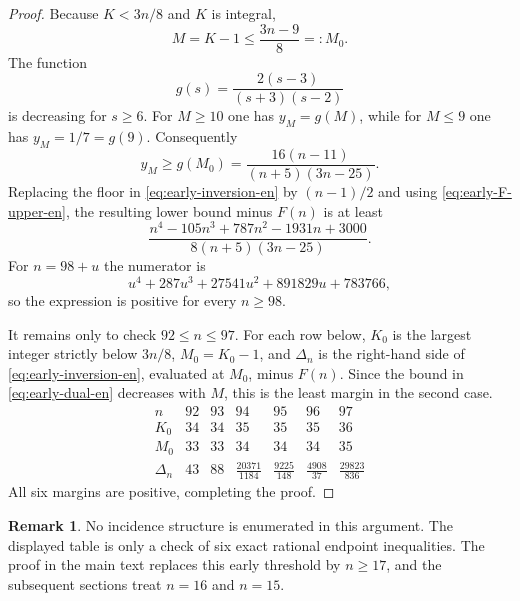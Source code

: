 \documentclass[11pt,a4paper]{article}
\theoremstyle{definition}
\newtheorem{remark}[theorem]{Remark}
\begin{document}
\begin{proof}
Because $K<3n/8$ and $K$ is integral,
\[
 M=K-1\le\frac{3n-9}{8}=:M_0.
\]
The function
\[
 g(s)=\frac{2(s-3)}{(s+3)(s-2)}
\]
is decreasing for $s\ge6$.  For $M\ge10$ one has $y_M=g(M)$, while for
$M\le9$ one has $y_M=1/7=g(9)$.  Consequently
\[
 y_M\ge g(M_0)=\frac{16(n-11)}{(n+5)(3n-25)}.
\]
Replacing the floor in \eqref{eq:early-inversion-en} by $(n-1)/2$ and using
\eqref{eq:early-F-upper-en}, the resulting lower bound minus $F(n)$ is at least
\[
 \frac{n^4-105n^3+787n^2-1931n+3000}
 {8(n+5)(3n-25)}.
\]
For $n=98+u$ the numerator is
\[
 u^4+287u^3+27541u^2+891829u+783766,
\]
so the expression is positive for every $n\ge98$.

It remains only to check $92\le n\le97$.  For each row below, $K_0$ is the
largest integer strictly below $3n/8$, $M_0=K_0-1$, and $\Delta_n$ is the
right-hand side of \eqref{eq:early-inversion-en}, evaluated at $M_0$, minus
$F(n)$.  Since the bound in \eqref{eq:early-dual-en} decreases with $M$, this
is the least margin in the second case.
\[
\begin{array}{c|rrrrrr}
n&92&93&94&95&96&97\\ \hline
K_0&34&34&35&35&35&36\\
M_0&33&33&34&34&34&35\\
\Delta_n&43&88&\frac{20371}{1184}&\frac{9225}{148}&
\frac{4908}{37}&\frac{29823}{836}
\end{array}
\]
All six margins are positive, completing the proof.
\end{proof}

\begin{remark}
No incidence structure is enumerated in this argument.  The displayed table is
only a check of six exact rational endpoint inequalities.  The proof in the
main text replaces this early threshold by $n\ge17$, and the subsequent
sections treat $n=16$ and $n=15$.
\end{remark}
\end{document}
